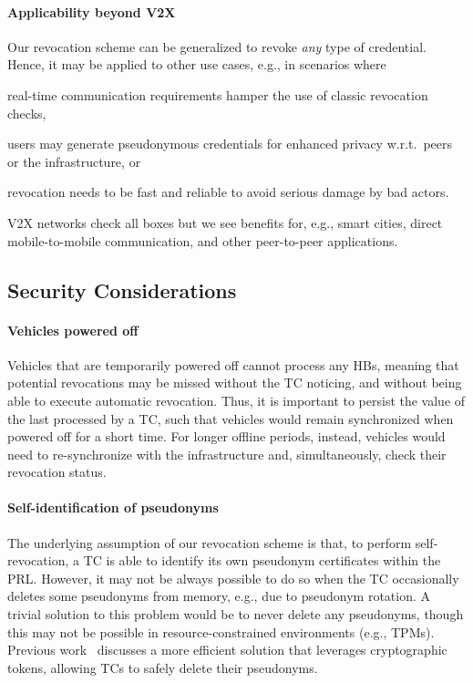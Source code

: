 \paragraph{Applicability beyond \ac{V2X}}
%
Our revocation scheme can be generalized to revoke \emph{any} type of
credential. Hence, it may be applied to other use cases, e.g., in scenarios
where
\begin{paraenum}
\item real-time communication requirements hamper the use of classic revocation
  checks,
\item users may generate pseudonymous credentials for enhanced privacy
  w.r.t.~peers or the infrastructure, or
\item revocation needs to be fast and reliable to avoid serious damage by bad
  actors.
\end{paraenum}
V2X networks check all boxes but we see benefits for, e.g., smart
cities, direct mobile-to-mobile communication, and other peer-to-peer
applications.

\subsection{Security Considerations}
\label{section:discussion-security}

\paragraph{Vehicles powered off}
%
Vehicles that are temporarily powered off cannot process any \acp{HB}, meaning
that potential revocations may be missed without the \ac{TC} noticing, and
without being able to execute automatic revocation. Thus, it is important to
persist the value of the last \paramthb{} processed by a \ac{TC}, such that
vehicles would remain synchronized when powered off for a short time. For longer
offline periods, instead, vehicles would need to re-synchronize with the
infrastructure and, simultaneously, check their revocation status.

\paragraph{Self-identification of pseudonyms}
%
The underlying assumption of our revocation scheme is that,  to perform
self-revocation, a \ac{TC} is able to identify its own pseudonym certificates
within the \ac{PRL}. However, it may not be always possible to do so when the
\ac{TC} occasionally deletes some pseudonyms from memory, e.g., due to pseudonym
rotation. A trivial solution to this problem would be to never delete any
pseudonyms, though this may not be possible in resource-constrained environments
(e.g., \acp{TPM}). Previous work~\cite{forster2015rewire,whitefield2017formal}
discusses a more efficient solution that leverages cryptographic tokens,
allowing \acp{TC} to safely delete their pseudonyms.

